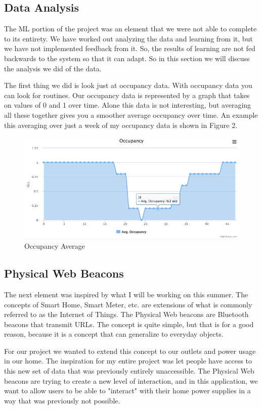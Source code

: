 \documentclass{sig-alternate-05-2015}
\begin{document}
\subsection{Data Analysis}

The ML portion of the project was an element that we were not able to complete to its entirety. We have worked out analyzing the data and learning from it, but we have not implemented feedback from it. So, the results of learning are not fed backwards to the system so that it can adapt. So in this section we will discuss the analysis we did of the data.

The first thing we did is look just at occupancy data. With occupancy data you can look for routines. Our occupancy data is represented by a graph that takes on values of 0 and 1 over time. Alone this data is not interesting, but averaging all these together gives you a smoother average occupancy over time. An example this averaging over just a week of my occupancy data is shown in Figure 2.

\begin{figure}
	\centering
	\includegraphics[scale=.25]{occ}
	\caption{Occupancy Average}
\end{figure}

\subsection{Physical Web Beacons}

The next element was inspired by what I will be working on this summer. The concepts of Smart Home, Smart Meter, etc. are extensions of what is commonly referred to as the Internet of Things. The Physical Web beacons are Bluetooth beacons that transmit URLs. The concept is quite simple, but that is for a good reason, because it is a concept that can generalize to everyday objects.

For our project we wanted to extend this concept to our outlets and power usage in our home. The inspiration for my entire project was let people have access to this new set of data that was previously entirely unaccessible. The Physical Web beacons are trying to create a new level of interaction, and in this application, we want to allow users to be able to "interact" with their home power supplies in a way that was previously not possible.
\end{document}
